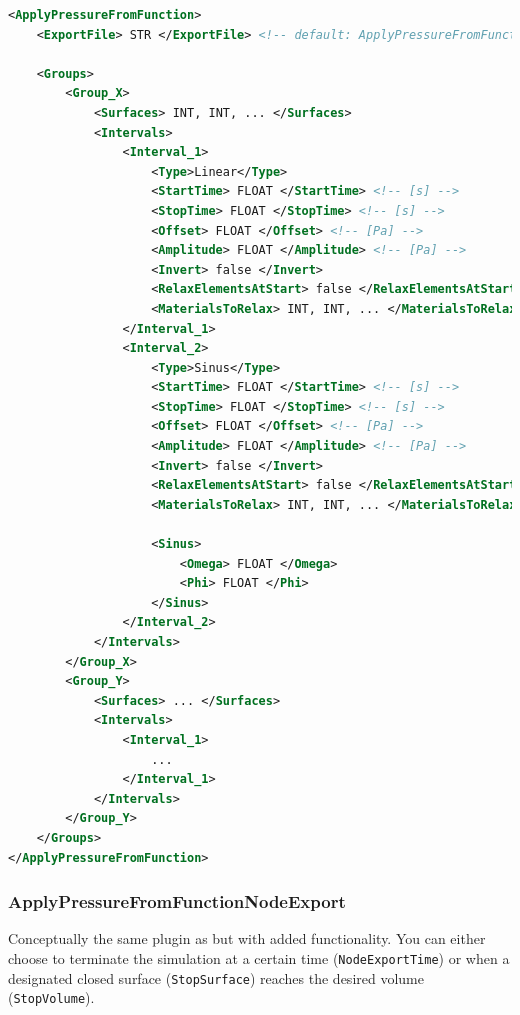 \begin{lstlisting}[language=XML,caption=.xml settings for the ApplyPressureFromFunction plugin]
<ApplyPressureFromFunction>
    <ExportFile> STR </ExportFile> <!-- default: ApplyPressureFromFunction.dat -->

    <Groups>
        <Group_X>
            <Surfaces> INT, INT, ... </Surfaces>
            <Intervals>
                <Interval_1>
                    <Type>Linear</Type>
                    <StartTime> FLOAT </StartTime> <!-- [s] -->
                    <StopTime> FLOAT </StopTime> <!-- [s] -->
                    <Offset> FLOAT </Offset> <!-- [Pa] -->
                    <Amplitude> FLOAT </Amplitude> <!-- [Pa] -->
                    <Invert> false </Invert>
                    <RelaxElementsAtStart> false </RelaxElementsAtStart>
                    <MaterialsToRelax> INT, INT, ... </MaterialsToRelax>
                </Interval_1>
                <Interval_2>
                    <Type>Sinus</Type>
                    <StartTime> FLOAT </StartTime> <!-- [s] -->
                    <StopTime> FLOAT </StopTime> <!-- [s] -->
                    <Offset> FLOAT </Offset> <!-- [Pa] -->
                    <Amplitude> FLOAT </Amplitude> <!-- [Pa] -->
                    <Invert> false </Invert>
                    <RelaxElementsAtStart> false </RelaxElementsAtStart>
                    <MaterialsToRelax> INT, INT, ... </MaterialsToRelax>

                    <Sinus>
                        <Omega> FLOAT </Omega>
                        <Phi> FLOAT </Phi>
                    </Sinus>
                </Interval_2>
            </Intervals>
        </Group_X>
        <Group_Y>
            <Surfaces> ... </Surfaces>
            <Intervals>
                <Interval_1>
                    ...
                </Interval_1>
            </Intervals>
        </Group_Y>
    </Groups>
</ApplyPressureFromFunction>
\end{lstlisting}

\subsubsection{ApplyPressureFromFunctionNodeExport}

Conceptually the same plugin as  but with added functionality.
You can either choose to terminate the simulation at a certain time (\verb|NodeExportTime|) or when a designated closed surface (\verb|StopSurface|) reaches the desired volume (\verb|StopVolume|).


